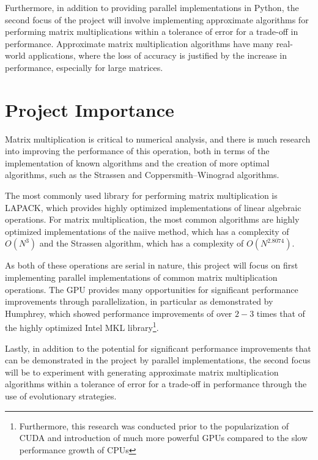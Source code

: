 \documentclass{article}
\begin{document}
Furthermore, in addition to providing parallel implementations in Python, the second focus of the project will involve implementing approximate algorithms for performing matrix multiplications within a tolerance of error for a trade-off in performance. Approximate matrix multiplication algorithms have many real-world applications, where the loss of accuracy is justified by the increase in performance\cite{drineas2006fastI}, especially for large matrices\cite{sarlos2006improved}.




\section{Project Importance}

Matrix multiplication is critical to numerical analysis, and there is much research into improving the performance of this operation, both in terms of the implementation of known algorithms\cite{note2002reducing} and the creation of more optimal algorithms, such as the Strassen and Coppersmith–Winograd algorithms\cite{huss1996implementation, coppersmith1987matrix}.

The most commonly used library for performing matrix multiplication is LAPACK\cite{anderson1990lapack}, which provides highly optimized implementations of linear algebraic operations. For matrix multiplication, the most common algorithms are highly optimized implementations of the naiive method, which has a complexity of $O(N^{3})$ and the Strassen algorithm, which has a complexity of $O(N^{2.8074})$\cite{huss1996implementation}.

As both of these operations are serial in nature, this project will focus on first implementing parallel implementations of common matrix multiplication operations. The GPU provides many opportunities for significant performance improvements through parallelization\cite{fatahalian2004understanding}, in particular as demonstrated by Humphrey, which showed performance improvements of over $2-3$ times that of the highly optimized Intel MKL library\cite{humphrey2010cula}\footnote{Furthermore, this research was conducted prior to the popularization of CUDA and introduction of much more powerful GPUs compared to the slow performance growth of CPUs}.

Lastly, in addition to the potential for significant performance improvements that can be demonstrated in the project by parallel implementations, the second focus will be to experiment with generating approximate matrix multiplication algorithms within a tolerance of error for a trade-off in performance through the use of evolutionary strategies.
\end{document}
